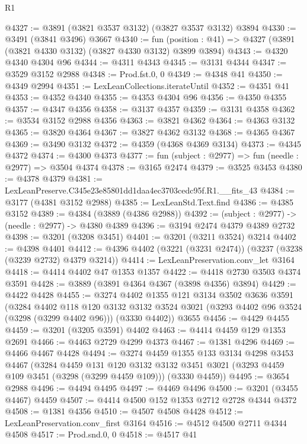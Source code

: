 \begin{lexlean}{R1}
\begin{coremodule}
@4327 := @3891 (@3821 @3537 @3132) (@3827 @3537 @3132) @3894
@4330 := @3491 (@3841 @3496) @3667
@4340 := fun (position : @41) => @4327 (@3891 (@3821 @4330 @3132) (@3827 @4330 @3132) @3899 @3894)
@4343 := @4320 @4340 @4304 @96
@4344 := @4311 @4343
@4345 := @3131 @4344
@4347 := @3529 @3152 @2988
@4348 := Prod.fst.{0, 0}
@4349 := @4348 @41
@4350 := @4349 @2994
@4351 := LexLeanCollections.iterateUntil
@4352 := @4351 @41
@4353 := @4352 @4340
@4355 := @4353 @4304 @96
@4356 := @4350 @4355
@4357 := @4347 @4356
@4358 := @3137 @4357
@4359 := @3131 @4358
@4362 := @3534 @3152 @2988 @4356
@4363 := @3821 @4362
@4364 := @4363 @3132
@4365 := @3820 @4364
@4367 := @3827 @4362 @3132
@4368 := @4365 @4367
@4369 := @3490 @3132
@4372 := @4359 (@4368 @4369 @3134)
@4373 := @4345 @4372
@4374 := @4300 @4373
@4377 := fun (subject : @2977) => fun (needle : @2977) => @3504 @4374
@4378 := @3165 @2474
@4379 := @3525 @3453
@4380 := @4378 @4379
@4381 := LexLeanPreserve.C345e23e85801dd1daa4ec3703cedc95f.R1.__fits_43
@4384 := @3177 (@4381 @3152 @2988)
@4385 := LexLeanStd.Text.find
@4386 := @4385 @3152
@4389 := @4384 (@3889 (@4386 @2988))
@4392 := (subject : @2977) -> (needle : @2977) -> @4380 @4389
@4396 := @3194 @2474 @4379 @4389 @2732
@4398 := @3201 (@3208 @3451)
@4401 := @3201 (@3211 @3524) @3214
@4402 := @4398 @4401
@4412 := @4396 @4402 (@3221 (@3231 @2474)) (@3237 (@3238 (@3239 @2732) @4379 @3214))
@4414 := LexLeanPreservation.conv_let @3164
@4418 := @4414 @4402 @47 @1353 @1357
@4422 := @4418 @2730 @3503 @4374 @3591
@4428 := @3889 (@3891 @4364 @4367 (@3898 @4356) @3894)
@4429 := @4422 @4428
@4455 := @3274
    @4402
    @1355
    @121
    @3134
    @3502
    @3636
    @3591
    (@3284
      @4402
      @118
      @120
      @3132
      @3132
      @3524
      @3021
      (@3293 @4402 @96 @3524 (@3298 (@3299 @4402 @96)))
      (@3330 @4402))
    @3655
@4456 := @4429 @4455
@4459 := @3201 (@3205 @3591) @4402
@4463 := @4414 @4459 @129 @1353 @2691
@4466 := @4463 @2729 @4299 @4373
@4467 := @1381 @4296
@4469 := @4466 @4467 @4428
@4494 := @3274
    @4459
    @1355
    @133
    @3134
    @4298
    @3453
    @4467
    (@3284
      @4459
      @131
      @120
      @3132
      @3132
      @3451
      @3021
      (@3293 @4459 @109 @3451 (@3298 (@3299 @4459 @109)))
      (@3330 @4459))
@4495 := @3654 @2988
@4496 := @4494 @4495
@4497 := @4469 @4496
@4500 := @3201 (@3455 @4467) @4459
@4507 := @4414 @4500 @152 @1353 @2712 @2728 @4344 @4372
@4508 := @1381 @4356
@4510 := @4507 @4508 @4428
@4512 := LexLeanPreservation.conv_first @3164
@4516 := @4512 @4500 @2711 @4344 @4508
@4517 := Prod.snd.{0, 0}
@4518 := @4517 @41

\end{coremodule}
\end{lexlean}
